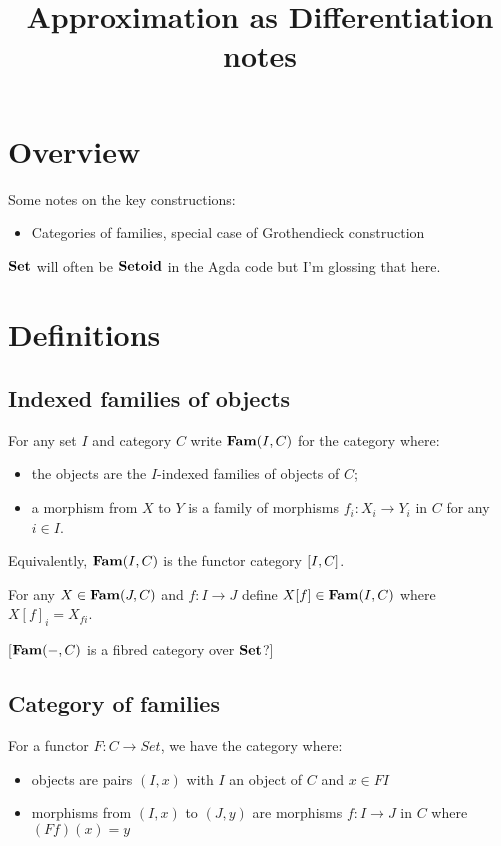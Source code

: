 \documentclass{acmart}
\begin{document}
\title{Approximation as Differentiation notes}
\maketitle

\section{Overview}

Some notes on the key constructions:
\begin{itemize}
\item Categories of families, special case of Grothendieck construction
\end{itemize}

\noindent $\mathbf{Set}$ will often be $\mathbf{Setoid}$ in the Agda code but I'm glossing that here.

\section{Definitions}

\subsection{Indexed families of objects}

For any set $I$ and category $C$ write $\mathbf{Fam}(I,C)$ for the category where:
\begin{itemize}
\item the objects are the $I$-indexed families of objects of $C$;
\item a morphism from $X$ to $Y$ is a family of morphisms $f_i: X_i \to Y_i$ in $C$ for any $i \in I$.
\end{itemize}

\noindent Equivalently, $\mathbf{Fam}(I,C)$ is the functor category $[I,C]$.

\begin{definition}
For any $X \in \mathbf{Fam}(J,C)$ and $f: I \to J$ define $X[f] \in \mathbf{Fam}(I,C)$ where $X[f]_i = X_{fi}$.
\end{definition}

[$\mathbf{Fam}(-,C)$ is a fibred category over $\mathbf{Set}$?]

\subsection{Category of families}

For a functor $F: C \to Set$, we have the category where:
\begin{itemize}
\item objects are pairs $(I, x)$ with $I$ an object of $C$ and $x \in FI$
\item morphisms from $(I, x)$ to $(J, y)$ are morphisms $f: I \to J$ in $C$ where $(Ff)(x) = y$
\end{itemize}
\end{document}

